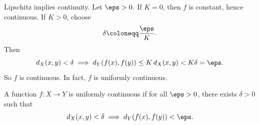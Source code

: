 \begin{proposition}{
	Lipschitz implies continuity.
}
	Let $\eps > 0$.
	If $K=0$, then $f$ is constant, hence continuous.
	If $K>0$, choose
	\[
		\delta \coloneqq \frac{\eps}{K}.
	\]
	Then
	\[
		d_X(x,y)<\delta \implies d_Y(f(x),f(y))\leq K\,d_X(x,y)<K\delta=\eps.
	\]
	So $f$ is continuous.
	In fact, $f$ is uniformly continuous.
\end{proposition}

\begin{definition}
	A function $f:X\to Y$ is uniformly continuous if for all $\eps > 0$, there exists $\delta>0$ such that
	\[
		d_X(x,y) < \delta\implies d_Y(f(x),f(y)) < \eps.
	\]
\end{definition}